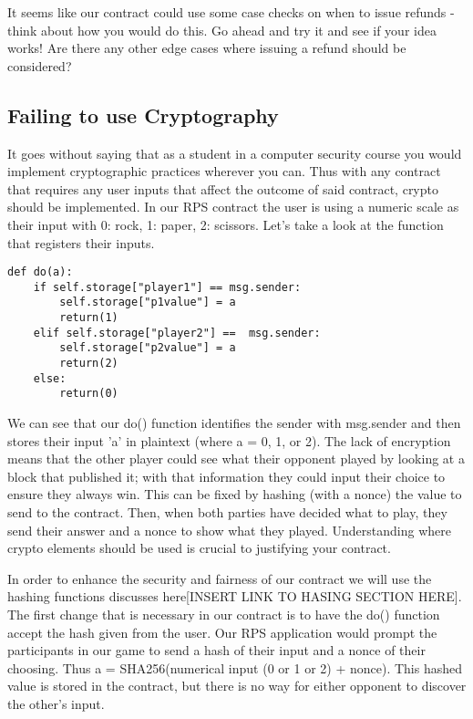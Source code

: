 \documentclass[12pt]{article}
\begin{document}
It seems like our contract could use some case checks on when to issue refunds - think about how you would do this. Go ahead and try it and see if your idea works! Are there any other edge cases where issuing a refund should be considered? 

\subsection{Failing to use Cryptography}
It goes without saying that as a student in a computer security course you would implement cryptographic practices wherever you can. Thus with any contract that requires any user inputs that affect the outcome of said contract, crypto should be implemented. In our RPS contract the user is using a numeric scale as their input with 0: rock, 1: paper, 2: scissors. Let's take a look at the function that registers their inputs.

\begin{lstlisting}
def do(a):
	if self.storage["player1"] == msg.sender:
		self.storage["p1value"] = a
		return(1)
	elif self.storage["player2"] ==  msg.sender:
		self.storage["p2value"] = a
		return(2)
	else:
		return(0)
\end{lstlisting}

We can see that our do() function identifies the sender with msg.sender and then stores their input 'a' in plaintext (where a = 0, 1, or 2). The lack of encryption means that the other player could see what their opponent played by looking at a block that published it; with that information they could input their choice to ensure they always win. This can be fixed by hashing (with a nonce) the value to send to the contract. Then, when both parties have decided what to play, they send their answer and a nonce to show what they played. Understanding where crypto elements should be used is crucial to justifying your contract. 

In order to enhance the security and fairness of our contract we will use the hashing functions discusses here[INSERT LINK TO HASING SECTION HERE]. The first change that is necessary in our contract is to have the do() function accept the hash given from the user. Our RPS application would prompt the participants in our game to send a hash of their input and a nonce of their choosing. Thus a = SHA256(numerical input (0 or 1 or 2) + nonce). This hashed value is stored in the contract, but there is no way for either opponent to discover the other's input.\\
\end{document}
